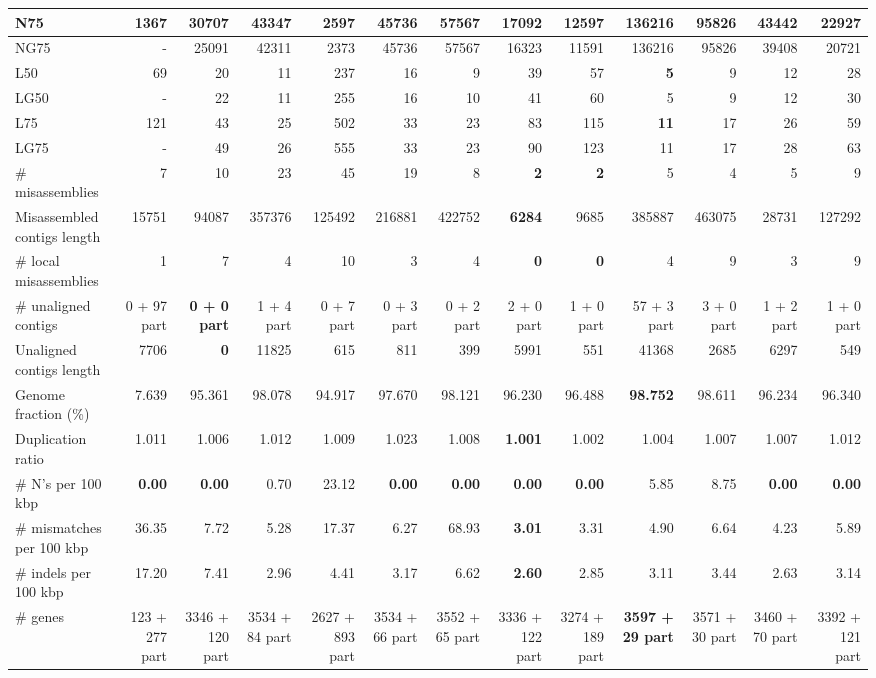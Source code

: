 \documentclass[12pt,a4paper]{article}
\begin{document}
\begin{table}[ht]
\begin{center}
\begin{tabular}{|l*{12}{|r}|}
N75 & 1367 & 30707 & 43347 & 2597 & 45736 & 57567 & 17092 & 12597 & {\bf 136216} & 95826 & 43442 & 22927 \\ \hline
NG75 & - & 25091 & 42311 & 2373 & 45736 & 57567 & 16323 & 11591 & 136216 & 95826 & 39408 & 20721 \\ \hline
L50 & 69 & 20 & 11 & 237 & 16 & 9 & 39 & 57 & {\bf 5} & 9 & 12 & 28 \\ \hline
LG50 & - & 22 & 11 & 255 & 16 & 10 & 41 & 60 & 5 & 9 & 12 & 30 \\ \hline
L75 & 121 & 43 & 25 & 502 & 33 & 23 & 83 & 115 & {\bf 11} & 17 & 26 & 59 \\ \hline
LG75 & - & 49 & 26 & 555 & 33 & 23 & 90 & 123 & 11 & 17 & 28 & 63 \\ \hline
\# misassemblies & 7 & 10 & 23 & 45 & 19 & 8 & {\bf 2} & {\bf 2} & 5 & 4 & 5 & 9 \\ \hline
Misassembled contigs length & 15751 & 94087 & 357376 & 125492 & 216881 & 422752 & {\bf 6284} & 9685 & 385887 & 463075 & 28731 & 127292 \\ \hline
\# local misassemblies & 1 & 7 & 4 & 10 & 3 & 4 & {\bf 0} & {\bf 0} & 4 & 9 & 3 & 9 \\ \hline
\# unaligned contigs & 0 + 97 part & {\bf 0 + 0 part} & 1 + 4 part & 0 + 7 part & 0 + 3 part & 0 + 2 part & 2 + 0 part & 1 + 0 part & 57 + 3 part & 3 + 0 part & 1 + 2 part & 1 + 0 part \\ \hline
Unaligned contigs length & 7706 & {\bf 0} & 11825 & 615 & 811 & 399 & 5991 & 551 & 41368 & 2685 & 6297 & 549 \\ \hline
Genome fraction (\%) & 7.639 & 95.361 & 98.078 & 94.917 & 97.670 & 98.121 & 96.230 & 96.488 & {\bf 98.752} & 98.611 & 96.234 & 96.340 \\ \hline
Duplication ratio & 1.011 & 1.006 & 1.012 & 1.009 & 1.023 & 1.008 & {\bf 1.001} & 1.002 & 1.004 & 1.007 & 1.007 & 1.012 \\ \hline
\# N's per 100 kbp & {\bf 0.00} & {\bf 0.00} & 0.70 & 23.12 & {\bf 0.00} & {\bf 0.00} & {\bf 0.00} & {\bf 0.00} & 5.85 & 8.75 & {\bf 0.00} & {\bf 0.00} \\ \hline
\# mismatches per 100 kbp & 36.35 & 7.72 & 5.28 & 17.37 & 6.27 & 68.93 & {\bf 3.01} & 3.31 & 4.90 & 6.64 & 4.23 & 5.89 \\ \hline
\# indels per 100 kbp & 17.20 & 7.41 & 2.96 & 4.41 & 3.17 & 6.62 & {\bf 2.60} & 2.85 & 3.11 & 3.44 & 2.63 & 3.14 \\ \hline
\# genes & 123 + 277 part & 3346 + 120 part & 3534 + 84 part & 2627 + 893 part & 3534 + 66 part & 3552 + 65 part & 3336 + 122 part & 3274 + 189 part & {\bf 3597 + 29 part} & 3571 + 30 part & 3460 + 70 part & 3392 + 121 part \\ \hline

\end{tabular}
\end{center}
\end{table}
\end{document}
